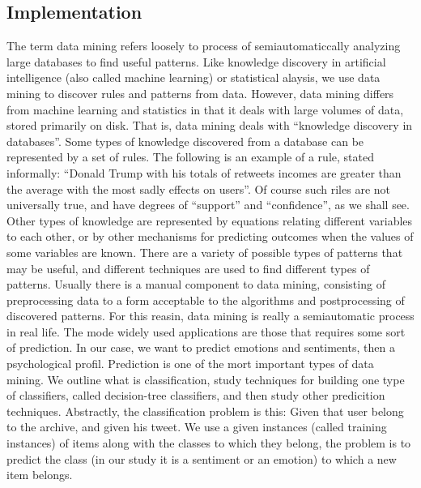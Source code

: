 \documentclass{acmtog} %
\begin{document}
\subsection{Implementation}
\label{subsub:implementation}
%
The term data mining refers loosely to process of semiautomaticcally analyzing large databases to find useful patterns. Like knowledge discovery in artificial intelligence (also called machine learning) or statistical alaysis, we use data mining to discover rules and patterns from data. However, data mining differs from machine learning and statistics in that it deals with large volumes of data, stored primarily on disk. That is, data mining deals with “knowledge discovery in databases”. Some types of knowledge discovered from a database can be represented by a set of rules. The following is an example of a rule, stated informally: “Donald Trump with his totals of retweets incomes are greater than the average with the most sadly effects on users”. Of course such riles are not universally true, and have degrees of “support” and “confidence”, as we shall see. Other types of knowledge are represented by equations relating different variables to each other, or by other mechanisms for predicting outcomes when the values of some variables are known. 
There are a variety of possible types of patterns that may be useful, and different techniques are used to find different types of patterns. Usually there is a manual component to data mining, consisting of preprocessing data to a form acceptable to the algorithms and postprocessing of discovered patterns. For this reasin, data mining is really a semiautomatic process in real life. 
The mode widely used applications are those that requires some sort of prediction. In our case, we want to predict emotions and sentiments, then a psychological profil. 
Prediction is one of the mort important types of data mining. We outline what is classification, study techniques for building one type of classifiers, called decision-tree classifiers, and then study other predicition techniques.
Abstractly, the classification problem is this: Given that user belong to the archive, and given his tweet. We use a given instances (called training instances) of items along with the classes to which they belong, the problem is to predict the class (in our study it is a sentiment or an emotion) to which a new item belongs.
\end{document}
